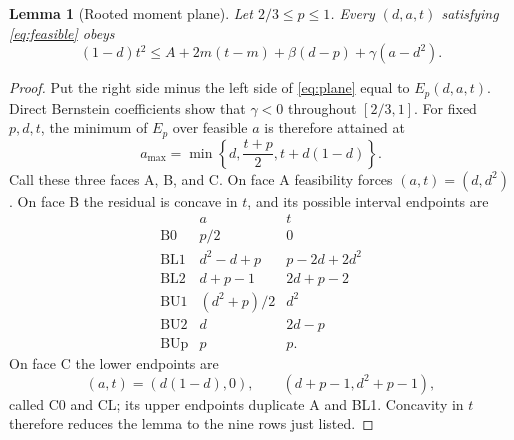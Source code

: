 \documentclass[11pt]{article}
\newtheorem{lemma}[theorem]{Lemma}
\begin{document}
\begin{lemma}[Rooted moment plane]\label{lem:plane}
Let $2/3\leq p\leq1$.  Every $(d,a,t)$ satisfying
\eqref{eq:feasible} obeys
\begin{equation}
 (1-d)t^2
 \leq A+2m(t-m)+\beta(d-p)+\gamma(a-d^2).
 \label{eq:plane}
\end{equation}
\end{lemma}

\begin{proof}
Put the right side minus the left side of \eqref{eq:plane} equal to
$E_p(d,a,t)$.  Direct Bernstein coefficients show that $\gamma<0$ throughout
$[2/3,1]$.  For fixed $p,d,t$, the minimum of $E_p$ over feasible $a$ is
therefore attained at
\[
 a_{\max}=\min\left\{d,\frac{t+p}{2},t+d(1-d)\right\}.
\]
Call these three faces A, B, and C.  On face A feasibility forces
$(a,t)=(d,d^2)$.  On face B the residual is concave in $t$, and its possible
interval endpoints are
\[
\begin{array}{c|c|c}
 &a&t\\ \hline
 \mathrm{B0}&p/2&0\\
 \mathrm{BL1}&d^2-d+p&p-2d+2d^2\\
 \mathrm{BL2}&d+p-1&2d+p-2\\
 \mathrm{BU1}&(d^2+p)/2&d^2\\
 \mathrm{BU2}&d&2d-p\\
 \mathrm{BUp}&p&p.
\end{array}
\]
On face C the lower endpoints are
\[
 (a,t)=(d(1-d),0),\qquad(d+p-1,d^2+p-1),
\]
called C0 and CL; its upper endpoints duplicate A and BL1.  Concavity in
$t$ therefore reduces the lemma to the nine rows just listed.


\end{proof}
\end{document}
